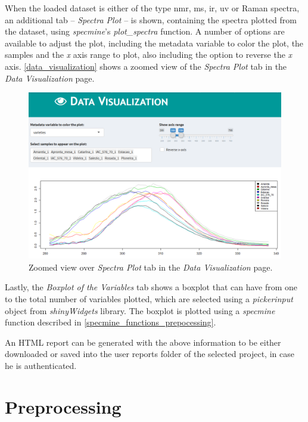 When the loaded dataset is either of the type \gls{nmr}, \gls{ms}, \gls{ir}, \gls{uv} or Raman spectra, an additional tab -- \textit{Spectra Plot} -- is shown, containing the spectra plotted from the dataset, using \textit{specmine}'s \textit{plot\_spectra} function. A number of options are available to adjust the plot, including the metadata variable to color the plot, the samples and the \textit{x} axis range to plot, also including  the option to reverse the \textit{x} axis.  \autoref{data_visualization} shows a zoomed view of the \textit{Spectra Plot} tab in the \textit{Data Visualization} page.

\begin{figure}[h]
	\centering
	\includegraphics[width=0.9\linewidth]{Imagens/data_visualization}
	\caption{Zoomed view over \textit{Spectra Plot} tab in the \textit{Data Visualization} page.}
	\label{data_visualization}
\end{figure}

Lastly, the \textit{Boxplot of the Variables} tab shows a boxplot that can have from one to the total number of variables plotted, which are selected using a \textit{pickerinput} object from \textit{shinyWidgets} library. The boxplot is plotted using a \textit{specmine} function described in \autoref{specmine_functions_prepocessing}.

An HTML report can be generated with the above information to be either downloaded or saved into the user reports folder of the selected project, in case he is authenticated.



\section{Preprocessing}

